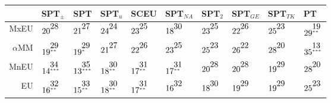 \begin{table}[!htb]
\centering
\begin{tabular}{rlllllllll}
  \hline
 & SPT$_{\pm}$ & SPT & SPT$_{u}$ & SCEU & SPT$_{NA}$ & SPT$_{2}$ & SPT$_{GE}$ & SPT$_{TK}$ & PT \\ 
  \hline
MxEU & $20^{\stackrel{\textstyle28\hfill}{\scriptscriptstyle\hfill}}$ & $21^{\stackrel{\textstyle27\hfill}{\scriptscriptstyle\hfill}}$ & $24^{\stackrel{\textstyle24\hfill}{\scriptscriptstyle\hfill}}$ & $23^{\stackrel{\textstyle25\hfill}{\scriptscriptstyle\hfill}}$ & $18^{\stackrel{\textstyle30\hfill}{\scriptscriptstyle\hfill}}$ & $23^{\stackrel{\textstyle25\hfill}{\scriptscriptstyle\hfill}}$ & $22^{\stackrel{\textstyle26\hfill}{\scriptscriptstyle\hfill}}$ & $25^{\stackrel{\textstyle23\hfill}{\scriptscriptstyle\hfill}}$ & $29^{\stackrel{\textstyle19\hfill}{\scriptscriptstyle**\hfill}}$ \\ 
  $\alpha$MM & $19^{\stackrel{\textstyle29\hfill}{\scriptscriptstyle**\hfill}}$ & $19^{\stackrel{\textstyle29\hfill}{\scriptscriptstyle*\hfill}}$ & $21^{\stackrel{\textstyle27\hfill}{\scriptscriptstyle\hfill}}$ & $22^{\stackrel{\textstyle26\hfill}{\scriptscriptstyle\hfill}}$ & $23^{\stackrel{\textstyle25\hfill}{\scriptscriptstyle\hfill}}$ & $25^{\stackrel{\textstyle23\hfill}{\scriptscriptstyle\hfill}}$ & $26^{\stackrel{\textstyle22\hfill}{\scriptscriptstyle\hfill}}$ & $28^{\stackrel{\textstyle20\hfill}{\scriptscriptstyle\hfill}}$ & $35^{\stackrel{\textstyle13\hfill}{\scriptscriptstyle***\hfill}}$ \\ 
  MnEU & $14^{\stackrel{\textstyle34\hfill}{\scriptscriptstyle***\hfill}}$ & $13^{\stackrel{\textstyle35\hfill}{\scriptscriptstyle***\hfill}}$ & $18^{\stackrel{\textstyle30\hfill}{\scriptscriptstyle**\hfill}}$ & $17^{\stackrel{\textstyle31\hfill}{\scriptscriptstyle**\hfill}}$ & $17^{\stackrel{\textstyle31\hfill}{\scriptscriptstyle**\hfill}}$ & $20^{\stackrel{\textstyle28\hfill}{\scriptscriptstyle\hfill}}$ & $20^{\stackrel{\textstyle28\hfill}{\scriptscriptstyle\hfill}}$ & $19^{\stackrel{\textstyle29\hfill}{\scriptscriptstyle\hfill}}$ & $28^{\stackrel{\textstyle20\hfill}{\scriptscriptstyle\hfill}}$ \\ 
  EU & $16^{\stackrel{\textstyle32\hfill}{\scriptscriptstyle**\hfill}}$ & $15^{\stackrel{\textstyle33\hfill}{\scriptscriptstyle**\hfill}}$ & $18^{\stackrel{\textstyle30\hfill}{\scriptscriptstyle**\hfill}}$ & $17^{\stackrel{\textstyle31\hfill}{\scriptscriptstyle**\hfill}}$ & $16^{\stackrel{\textstyle32\hfill}{\scriptscriptstyle\hfill}}$ & $18^{\stackrel{\textstyle30\hfill}{\scriptscriptstyle\hfill}}$ & $19^{\stackrel{\textstyle29\hfill}{\scriptscriptstyle\hfill}}$ & $19^{\stackrel{\textstyle29\hfill}{\scriptscriptstyle\hfill}}$ & $25^{\stackrel{\textstyle23\hfill}{\scriptscriptstyle\hfill}}$ \\ 

\end{tabular}
\end{table}
